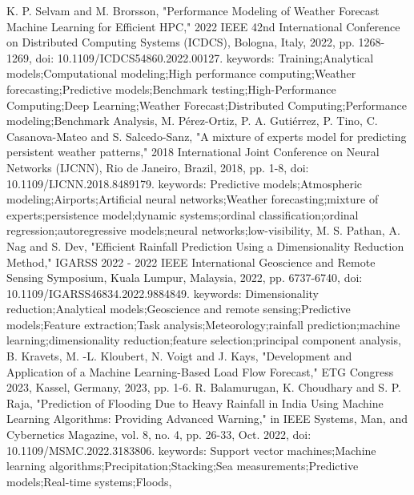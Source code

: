 \documentclass[conference]{IEEEtran}
\begin{document}
\begin{thebibliography}{00}
 K. P. Selvam and M. Brorsson, "Performance Modeling of Weather Forecast Machine Learning for Efficient HPC," 2022 IEEE 42nd International Conference on Distributed Computing Systems (ICDCS), Bologna, Italy, 2022, pp. 1268-1269, doi: 10.1109/ICDCS54860.2022.00127. keywords: {Training;Analytical models;Computational modeling;High performance computing;Weather forecasting;Predictive models;Benchmark testing;High-Performance Computing;Deep Learning;Weather Forecast;Distributed Computing;Performance modeling;Benchmark Analysis},
 M. Pérez-Ortiz, P. A. Gutiérrez, P. Tino, C. Casanova-Mateo and S. Salcedo-Sanz, "A mixture of experts model for predicting persistent weather patterns," 2018 International Joint Conference on Neural Networks (IJCNN), Rio de Janeiro, Brazil, 2018, pp. 1-8, doi: 10.1109/IJCNN.2018.8489179. keywords: {Predictive models;Atmospheric modeling;Airports;Artificial neural networks;Weather forecasting;mixture of experts;persistence model;dynamic systems;ordinal classification;ordinal regression;autoregressive models;neural networks;low-visibility},
 M. S. Pathan, A. Nag and S. Dev, "Efficient Rainfall Prediction Using a Dimensionality Reduction Method," IGARSS 2022 - 2022 IEEE International Geoscience and Remote Sensing Symposium, Kuala Lumpur, Malaysia, 2022, pp. 6737-6740, doi: 10.1109/IGARSS46834.2022.9884849. keywords: {Dimensionality reduction;Analytical models;Geoscience and remote sensing;Predictive models;Feature extraction;Task analysis;Meteorology;rainfall prediction;machine learning;dimensionality reduction;feature selection;principal component analysis},
 B. Kravets, M. -L. Kloubert, N. Voigt and J. Kays, "Development and Application of a Machine Learning-Based Load Flow Forecast," ETG Congress 2023, Kassel, Germany, 2023, pp. 1-6.
 R. Balamurugan, K. Choudhary and S. P. Raja, "Prediction of Flooding Due to Heavy Rainfall in India Using Machine Learning Algorithms: Providing Advanced Warning," in IEEE Systems, Man, and Cybernetics Magazine, vol. 8, no. 4, pp. 26-33, Oct. 2022, doi: 10.1109/MSMC.2022.3183806. keywords: {Support vector machines;Machine learning algorithms;Precipitation;Stacking;Sea measurements;Predictive models;Real-time systems;Floods},
\end{thebibliography}
\vspace{12pt}
\color{red}
\end{document}
